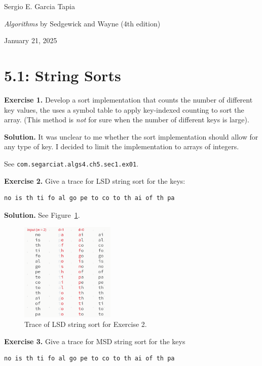\documentclass[12pt, a4paper]{article}
\newenvironment{ex}[2][Exercise]
{\par\medskip\noindent \textbf{#1 #2.}}
{\medskip}
\newenvironment{sol}[1][Solution]
{\par\medskip\noindent \textbf{#1.} }
{\medskip}
\begin{document}
	\noindent Sergio E. Garcia Tapia \hfill
	
	\noindent \emph{Algorithms} by Sedgewick and Wayne (4th edition) \cite{sedgewick_wayne}\hfill
	
	\noindent January 21, 2025\hfill 
	\section*{5.1: String Sorts}
	\begin{ex}{1}
		Develop a sort implementation that counts the number of different key values,
		the uses a symbol table to apply key-indexed counting to sort the array.
		(This method is \emph{not} for sure when the number of different keys is large).
	\end{ex}
	\begin{sol}
		It was unclear to me whether the sort implementation should allow for any type
		of key. I decided to limit the implementation to arrays of integers.
		
		See \texttt{com.segarciat.algs4.ch5.sec1.ex01}.
	\end{sol}
	\begin{ex}{2}
		Give a trace for LSD string sort for the keys:
		\begin{lstlisting}[language={}]
			no is th ti fo al go pe to co to th ai of th pa
		\end{lstlisting}
	\end{ex}
	\begin{sol}
		See Figure~\ref{fig:ex-02}.
		\begin{figure}
			\centering
			\includegraphics[width=0.4\textwidth]{exercise-02}
			\caption{Trace of LSD string sort for Exercise 2.}
			\label{fig:ex-02}
		\end{figure}
	\end{sol}
	\begin{ex}{3}
		Give a trace for MSD string sort for the keys
		\begin{lstlisting}[language={}]
			no is th ti fo al go pe to co to th ai of th pa
		\end{lstlisting}
	\end{ex}
\end{document}
